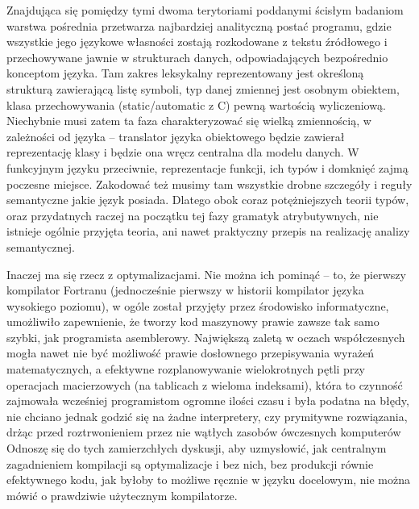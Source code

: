 Znajdująca się pomiędzy tymi dwoma terytoriami poddanymi ścisłym badaniom warstwa pośrednia przetwarza najbardziej analityczną postać programu, gdzie wszystkie jego językowe własności zostają rozkodowane z tekstu źródłowego i przechowywane jawnie w strukturach danych, odpowiadających bezpośrednio konceptom języka. Tam zakres leksykalny reprezentowany jest określoną strukturą zawierającą listę symboli, typ danej zmiennej jest osobnym  obiektem, klasa przechowywania (static/automatic z C) pewną wartością wyliczeniową. Niechybnie musi zatem ta faza charakteryzować się wielką zmiennością, w zależności od języka – translator języka obiektowego będzie zawierał reprezentację klasy i będzie ona wręcz centralna dla modelu danych. W funkcyjnym języku przeciwnie, reprezentacje funkcji, ich typów i domknięć zajmą poczesne miejsce. Zakodować też musimy tam wszystkie drobne szczegóły i reguły semantyczne jakie język posiada. Dlatego obok coraz potężniejszych teorii typów, oraz przydatnych raczej na początku tej fazy gramatyk atrybutywnych, nie istnieje ogólnie przyjęta teoria, ani nawet praktyczny przepis na realizację analizy semantycznej.

Inaczej ma się rzecz z optymalizacjami. Nie można ich pominąć – to, że pierwszy kompilator Fortranu (jednocześnie pierwszy w historii kompilator języka wysokiego poziomu), w ogóle został przyjęty przez środowisko informatyczne, umożliwiło zapewnienie, że tworzy kod maszynowy prawie zawsze tak samo szybki, jak programista asemblerowy. Największą zaletą w oczach współczesnych mogła nawet nie być możliwość prawie dosłownego przepisywania wyrażeń matematycznych, a efektywne rozplanowywanie wielokrotnych pętli przy operacjach macierzowych (na tablicach z wieloma indeksami), która to czynność zajmowała wcześniej programistom ogromne ilości czasu i była podatna na błędy, nie chciano jednak godzić się na żadne interpretery, czy prymitywne rozwiązania, drżąc przed roztrwonieniem przez nie wątłych zasobów ówczesnych komputerów\cite{FORTRAN_AUTOMATIC_CODING_SYSTEM}
Odnoszę się do tych zamierzchłych dyskusji, aby uzmysłowić, jak centralnym zagadnieniem kompilacji są optymalizacje i bez nich, bez produkcji równie efektywnego kodu, jak byłoby to możliwe ręcznie w języku docelowym, nie można mówić o prawdziwie użytecznym  kompilatorze.

